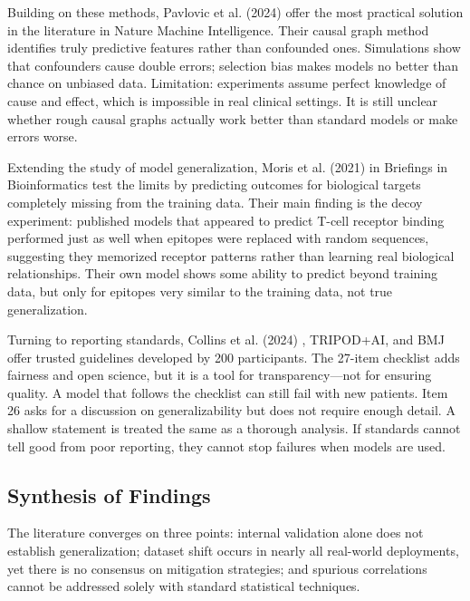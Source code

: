 Building on these methods, Pavlovic et al. (2024) \cite{pavlovic2024causal} offer the most practical solution in the literature in Nature Machine Intelligence. Their causal graph method identifies truly predictive features rather than confounded ones. Simulations show that confounders cause double errors; selection bias makes models no better than chance on unbiased data. Limitation: experiments assume perfect knowledge of cause and effect, which is impossible in real clinical settings. It is still unclear whether rough causal graphs actually work better than standard models or make errors worse.

Extending the study of model generalization, Moris et al. (2021) \cite{springer2021unseen} in Briefings in Bioinformatics test the limits by predicting outcomes for biological targets completely missing from the training data. Their main finding is the decoy experiment: published models that appeared to predict T-cell receptor binding performed just as well when epitopes were replaced with random sequences, suggesting they memorized receptor patterns rather than learning real biological relationships. Their own model shows some ability to predict beyond training data, but only for epitopes very similar to the training data, not true generalization.

Turning to reporting standards, Collins et al. (2024) \cite{collins2024tripod}, TRIPOD+AI, and BMJ offer trusted guidelines developed by 200 participants. The 27-item checklist adds fairness and open science, but it is a tool for transparency—not for ensuring quality. A model that follows the checklist can still fail with new patients. Item 26 asks for a discussion on generalizability but does not require enough detail. A shallow statement is treated the same as a thorough analysis. If standards cannot tell good from poor reporting, they cannot stop failures when models are used.

\subsection{Synthesis of Findings}

The literature converges on three points: internal validation alone does not establish generalization; dataset shift occurs in nearly all real-world deployments, yet there is no consensus on mitigation strategies; and spurious correlations cannot be addressed solely with standard statistical techniques.


